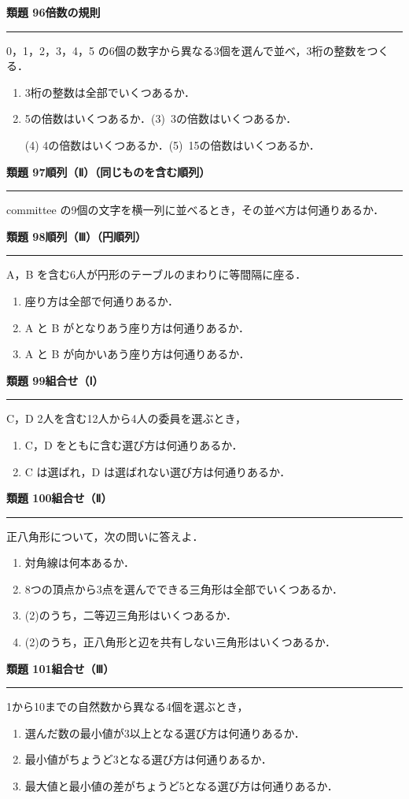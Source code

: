 \documentclass[a4paper,11pt]{ltjsarticle}
\newcommand{\mon}[2]{\Needspace{7\baselineskip}\vspace{10pt}%
  {\sffamily\bfseries 類題 #1\quad #2\par}\vspace{2pt}\hrule\vspace{4pt}}
\begin{document}
\mon{96}{倍数の規則}
0，1，2，3，4，5 の6個の数字から異なる3個を選んで並べ，3桁の整数をつくる．
\begin{enumerate}
\item 3桁の整数は全部でいくつあるか．
\item 5の倍数はいくつあるか．\qquad (3)\ 3の倍数はいくつあるか．
\item[(4)] 4の倍数はいくつあるか．\qquad (5)\ 15の倍数はいくつあるか．
\end{enumerate}

\mon{97}{順列（Ⅱ）（同じものを含む順列）}
committee の9個の文字を横一列に並べるとき，その並べ方は何通りあるか．

\mon{98}{順列（Ⅲ）（円順列）}
A，B を含む6人が円形のテーブルのまわりに等間隔に座る．
\begin{enumerate}
\item 座り方は全部で何通りあるか．
\item A と B がとなりあう座り方は何通りあるか．
\item A と B が向かいあう座り方は何通りあるか．
\end{enumerate}

\mon{99}{組合せ（Ⅰ）}
C，D 2人を含む12人から4人の委員を選ぶとき，
\begin{enumerate}
\item C，D をともに含む選び方は何通りあるか．
\item C は選ばれ，D は選ばれない選び方は何通りあるか．
\end{enumerate}

\mon{100}{組合せ（Ⅱ）}
正八角形について，次の問いに答えよ．
\begin{enumerate}
\item 対角線は何本あるか．
\item 8つの頂点から3点を選んでできる三角形は全部でいくつあるか．
\item (2)のうち，二等辺三角形はいくつあるか．
\item (2)のうち，正八角形と辺を共有しない三角形はいくつあるか．
\end{enumerate}

\mon{101}{組合せ（Ⅲ）}
1から10までの自然数から異なる4個を選ぶとき，
\begin{enumerate}
\item 選んだ数の最小値が3以上となる選び方は何通りあるか．
\item 最小値がちょうど3となる選び方は何通りあるか．
\item 最大値と最小値の差がちょうど5となる選び方は何通りあるか．
\end{enumerate}
\end{document}
